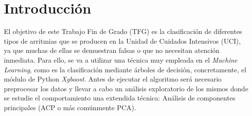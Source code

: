 \chapter {Introducci\'on}

	El objetivo de este Trabajo Fin de Grado (TFG) es la clasificación de diferentes tipos de arritmias que se producen en la Unidad de Cuidados Intensivos (UCI), ya que muchas de ellas se demuestran falsas o que no necesitan atención inmediata. Para ello, se va a utilizar una técnica muy empleada en el \textit{Machine Learning}, como es la clasificación mediante árboles de decisión, concretamente, el módulo de Python \textit{Xgboost}. Antes de ejecutar el algoritmo será necesario preprocesar los datos y llevar a cabo un análisis exploratorio de los mismos donde se estudie el comportamiento una extendida técnica: Análisis de componentes principales (ACP o más comúnmente PCA).\par 

